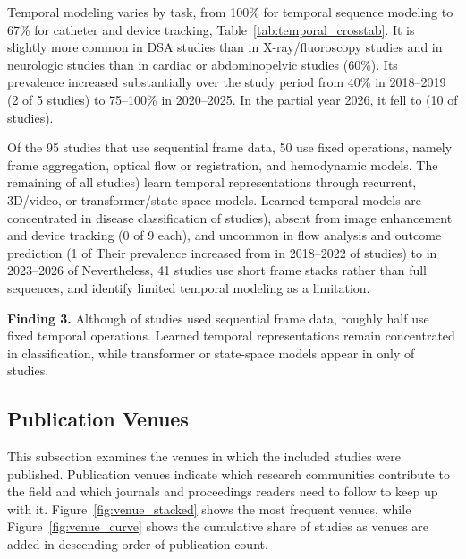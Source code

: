 Temporal modeling varies by task, from 100\% for temporal sequence modeling  to 67\% for catheter and device tracking, Table~\ref{tab:temporal_crosstab}. It is slightly more common in DSA studies  than in X-ray/fluoroscopy studies  and in neurologic studies  than in cardiac  or abdominopelvic studies (60\%). Its prevalence increased substantially over the study period from 40\% in 2018--2019 (2 of 5 studies) to 75--100\% in 2020--2025. In the partial year 2026, it fell to  (10 of  studies).

Of the 95 studies that use sequential frame data, 50 use fixed operations, namely frame aggregation, optical flow or registration, and hemodynamic models. The remaining   of all studies) learn temporal representations through recurrent, 3D/video, or transformer/state-space models. Learned temporal models are concentrated in disease classification  of  studies), absent from image enhancement and device tracking (0 of 9 each), and uncommon in flow analysis  and outcome prediction (1 of  Their prevalence increased from  in 2018--2022  of  studies) to  in 2023--2026  of  Nevertheless, 41 studies  use short frame stacks rather than full sequences, and  identify limited temporal modeling as a limitation.

\vspace{0.25cm}
\begin{mdframed}[linewidth=0.5pt, linecolor=black, backgroundcolor=blue!10]
\textbf{Finding 3.} Although  of studies used sequential frame data, roughly half use fixed temporal operations. Learned temporal representations remain concentrated in classification, while transformer or state-space models appear in only  of studies.
\end{mdframed}
\vspace{0.25cm}





\subsection{Publication Venues}
\label{subsec:venues}

This subsection examines the venues in which the included studies were published. Publication venues indicate which research communities contribute to the field and which journals and proceedings readers need to follow to keep up with it. Figure~\ref{fig:venue_stacked} shows the most frequent venues, while Figure~\ref{fig:venue_curve} shows the cumulative share of studies as venues are added in descending order of publication count.

